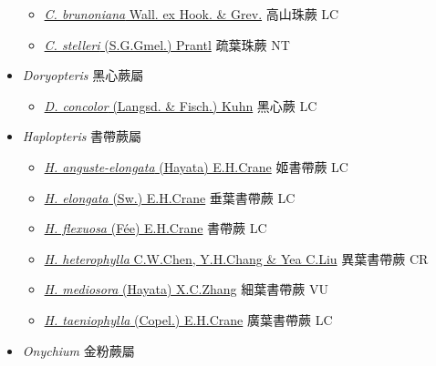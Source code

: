 \begin{itemize}
  \begin{itemize}
        \item[] \href{http://www.theplantlist.org/tpl1.1/search?q=Cryptogramma+brunoniana}{\textit{C. brunoniana} Wall. ex Hook. \& Grev.}   高山珠蕨   LC
        \item[] \href{http://www.theplantlist.org/tpl1.1/search?q=Cryptogramma+stelleri}{\textit{C. stelleri} (S.G.Gmel.) Prantl}   疏葉珠蕨   NT
  \end{itemize}
 \item[    ] \textit{Doryopteris} 黑心蕨屬
                                
  \begin{itemize}
        \item[] \href{http://www.theplantlist.org/tpl1.1/search?q=Doryopteris+concolor}{\textit{D. concolor} (Langsd. \& Fisch.) Kuhn}   黑心蕨   LC
  \end{itemize}
 \item[    ] \textit{Haplopteris} 書帶蕨屬
                                
  \begin{itemize}
        \item[] \href{http://www.theplantlist.org/tpl1.1/search?q=Haplopteris+anguste-elongata}{\textit{H. anguste-elongata} (Hayata) E.H.Crane}   姬書帶蕨   LC
        \item[] \href{http://www.theplantlist.org/tpl1.1/search?q=Haplopteris+elongata}{\textit{H. elongata} (Sw.) E.H.Crane}   垂葉書帶蕨   LC
        \item[] \href{http://www.theplantlist.org/tpl1.1/search?q=Haplopteris+flexuosa}{\textit{H. flexuosa} (Fée) E.H.Crane}   書帶蕨   LC
        \item[] \href{http://www.theplantlist.org/tpl1.1/search?q=Haplopteris+heterophylla}{\textit{H. heterophylla} C.W.Chen, Y.H.Chang \& Yea C.Liu}   異葉書帶蕨   CR
        \item[] \href{http://www.theplantlist.org/tpl1.1/search?q=Haplopteris+mediosora}{\textit{H. mediosora} (Hayata) X.C.Zhang}   細葉書帶蕨   VU
        \item[] \href{http://www.theplantlist.org/tpl1.1/search?q=Haplopteris+taeniophylla}{\textit{H. taeniophylla} (Copel.) E.H.Crane}   廣葉書帶蕨   LC
  \end{itemize}
 \item[    ] \textit{Onychium} 金粉蕨屬
                                

\end{itemize}
